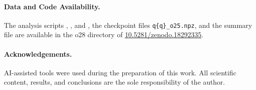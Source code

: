 \documentclass[11pt,a4paper]{article}
\theoremstyle{definition}
\begin{document}
  \clearpage

  \paragraph{Data and Code Availability.}
    The analysis scripts , , and
    , the checkpoint files \texttt{q\{q\}\_o25.npz}, and the summary
    file  are available in the o28 directory of
    \href{https://doi.org/10.5281/zenodo.18292335}{10.5281/zenodo.18292335}.

  \paragraph{Acknowledgements.}
    AI-assisted tools were used during the preparation of this work.
    All scientific content, results, and conclusions are the sole responsibility of the author.

    
    
\end{document}

